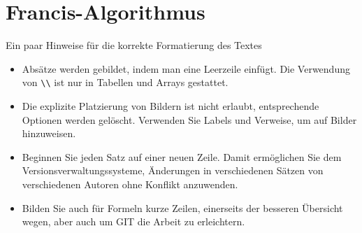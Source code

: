%
%
%
\chapter{Francis-Algorithmus\label{chapter:francis}}
\begin{refsection}

Ein paar Hinweise für die korrekte Formatierung des Textes
\begin{itemize}
\item
Absätze werden gebildet, indem man eine Leerzeile einfügt.
Die Verwendung von \verb+\\+ ist nur in Tabellen und Arrays gestattet.
\item
Die explizite Platzierung von Bildern ist nicht erlaubt, entsprechende
Optionen werden gelöscht. 
Verwenden Sie Labels und Verweise, um auf Bilder hinzuweisen.
\item
Beginnen Sie jeden Satz auf einer neuen Zeile. 
Damit ermöglichen Sie dem Versionsverwaltungssysteme, Änderungen
in verschiedenen Sätzen von verschiedenen Autoren ohne Konflikt 
anzuwenden.
\item 
Bilden Sie auch für Formeln kurze Zeilen, einerseits der besseren
Übersicht wegen, aber auch um GIT die Arbeit zu erleichtern.
\end{itemize}






\printbibliography[heading=subbibliography]
\end{refsection}
